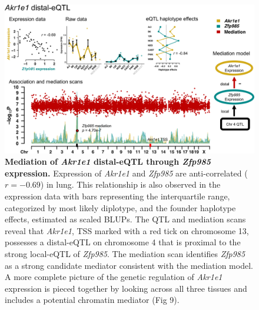 \documentclass[10pt,letterpaper,twoside]{article}
\begin{document}
\begin{figure}[hp]
\renewcommand{\familydefault}{\sfdefault}\normalfont
\centering
\includegraphics[width=\textwidth, trim={0in 0.5in 0in 0in}, clip]{figs/akr1e1_mediation.png}
\caption{\textbf{Mediation of \textit{Akr1e1} distal-eQTL through \textit{Zfp985} expression.} 
Expression of \textit{Akr1e1} and \textit{Zfp985} are anti-correlated ($r = -0.69$) in lung. This relationship is also observed in the expression data with bars representing the interquartile range, categorized by most likely diplotype, and the founder haplotype effects, estimated as scaled BLUPs. The QTL and mediation scans reveal that \textit{Akr1e1}, TSS marked with a red tick on chromosome 13, possesses a distal-eQTL on chromosome 4 that is proximal to the strong local-eQTL of \textit{Zfp985}. The mediation scan identifies \textit{Zfp985} as a strong candidate mediator consistent with the mediation model. A more complete picture of the genetic regulation of \textit{Akr1e1} expression is pieced together by looking across all three tissues and includes a potential chromatin mediator (Fig 9).
\label{fig:akr1e1_exmediation}}
\end{figure}

\clearpage
\end{document}
